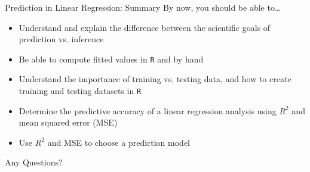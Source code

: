 \documentclass[10pt,t]{beamer}
\begin{document}
\begin{frame}{Prediction in Linear Regression: Summary}
By now, you should be able to\dots

\vspace{0.3cm}
\begin{itemize}
	\item Understand and explain the difference between the scientific goals of prediction vs. inference
	\item Be able to compute fitted values in \texttt{R} and by hand
	\item Understand the importance of training vs. testing data, and how to create training and testing datasets in \texttt{R}
	\item Determine the predictive accuracy of a linear regression analysis using $R^2$ and mean squared error (MSE)
	\item Use $R^2$ and MSE to choose a prediction model
\end{itemize}
\end{frame}


\begin{frame}[c]
\centering \huge Any Questions?
\end{frame}
\end{document}
